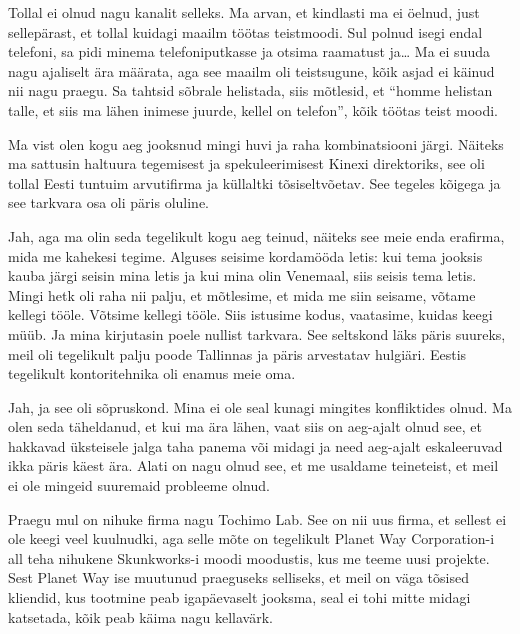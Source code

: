 Tollal ei olnud nagu kanalit selleks. Ma arvan, et  kindlasti ma ei öelnud, 
just sellepärast, et tollal kuidagi maailm töötas teistmoodi. Sul polnud isegi 
endal telefoni, sa pidi minema telefoniputkasse ja otsima raamatust ja\ldots  
Ma ei suuda nagu ajaliselt ära määrata, aga see maailm oli teistsugune, kõik 
asjad ei käinud nii nagu praegu. Sa tahtsid sõbrale helistada, siis mõtlesid, 
et \enquote{homme helistan talle, et siis ma lähen inimese juurde, kellel on 
telefon}, kõik töötas teist moodi. 


Ma vist olen kogu aeg jooksnud mingi huvi ja raha kombinatsiooni järgi. Näiteks 
ma sattusin haltuura tegemisest ja spekuleerimisest  Kinexi 
direktoriks, see oli tollal Eesti tuntuim arvutifirma ja küllaltki 
tõsiseltvõetav. See tegeles kõigega ja see tarkvara osa oli päris oluline. 


Jah, aga ma olin seda  tegelikult kogu aeg teinud, näiteks see meie enda 
erafirma, mida me kahekesi tegime. Alguses seisime kordamööda letis: kui tema 
jooksis kauba järgi seisin mina letis  ja kui mina olin Venemaal, siis seisis 
tema letis. Mingi hetk oli raha nii palju, et mõtlesime, et mida me siin 
seisame, võtame kellegi tööle. Võtsime kellegi tööle. Siis istusime kodus, 
vaatasime, kuidas keegi müüb. Ja mina kirjutasin poele  nullist tarkvara. See 
seltskond läks päris suureks, meil oli tegelikult palju poode Tallinnas ja 
päris arvestatav hulgiäri. Eestis tegelikult kontoritehnika oli enamus meie 
oma. 


Jah, ja see oli sõpruskond. Mina ei ole seal kunagi mingites konfliktides 
olnud. Ma olen seda täheldanud, et kui ma ära lähen, vaat siis on aeg-ajalt 
olnud see, et hakkavad üksteisele jalga  taha panema või midagi ja need 
aeg-ajalt eskaleeruvad ikka päris käest ära. Alati on nagu olnud  see, et me 
usaldame teineteist, et meil ei ole mingeid suuremaid probleeme olnud. 


Praegu mul on nihuke firma nagu Tochimo Lab. See on nii uus 
firma, et sellest ei ole keegi veel kuulnudki, aga selle mõte on tegelikult 
Planet Way Corporation-i all teha nihukene Skunkworks-i moodi moodustis, kus me 
teeme uusi projekte. Sest Planet Way ise muutunud praeguseks selliseks, et meil 
on väga tõsised kliendid, kus tootmine peab igapäevaselt jooksma, seal ei tohi 
mitte midagi katsetada,  kõik peab  käima nagu kellavärk. 

